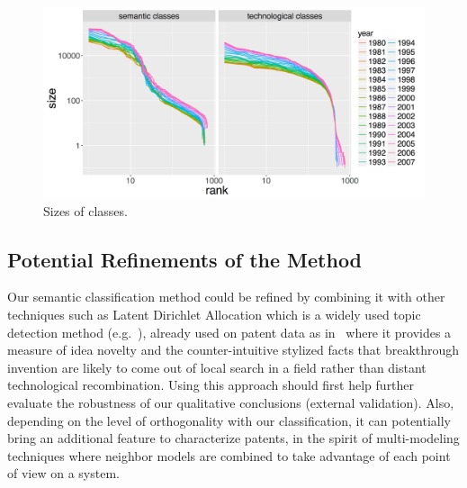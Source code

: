 \documentclass[article]{article}%
\begin{document}
\begin{figure}
\centering
\hspace*{-2.5cm}
\includegraphics[width=\textwidth]{figures/Fig4}
\caption{Sizes of classes.} 
\label{fig:class-sizes}
\end{figure}


\subsection{Potential Refinements of the Method}

Our semantic classification method could be refined by combining it with other techniques such as Latent Dirichlet Allocation which is a widely used topic detection method (e.g.~\cite{blei2003latent}), already used on patent data as in~\cite{kaplan2015double} where it provides a measure of idea novelty and the counter-intuitive stylized facts that breakthrough invention are likely to come out of local search in a field rather than distant technological recombination. Using this approach should first help further evaluate the robustness of our qualitative conclusions (external validation). Also, depending on the level of orthogonality with our classification, it can potentially bring an additional feature to characterize patents, in the spirit of multi-modeling techniques where neighbor models are combined to take advantage of each point of view on a system.
\end{document}
